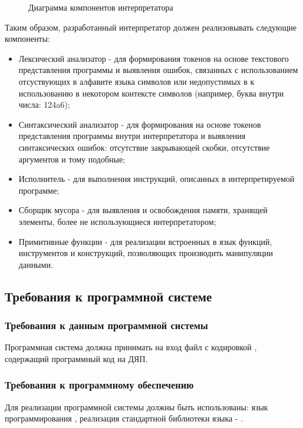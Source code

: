 \begin{figure}[ht]
	\caption{Диаграмма компонентов интерпретатора}
	\label{kompdiagram:image}
\end{figure}

Таким образом, разработанный интерпретатор должен реализовывать следующие компоненты:
\begin{itemize}
	\item Лексический анализатор - для формирования токенов на основе текстового представления программы и выявления ошибок, связанных с использованием отсуствующих в алфавите языка символов или недопустимых в к использованию в некотором контексте символов (например, буква внутри числа: 124a6);
	\item Синтаксический анализатор - для формирования на основе токенов представления программы внутри интерпретатора и выявления синтаксических ошибок: отсутствие закрывающей скобки, отсутствие аргументов и тому подобные;
	\item Исполнитель - для выполнения инструкций, описанных в интерпретируемой программе;
	\item Сборщик мусора - для выявления и освобождения памяти, хранящей элементы, более не использующиеся интерпретатором;
	\item Примитивные функции - для реализации встроенных в язык функций, инструментов и конструкций, позволяющих производить манипуляции данными.
\end{itemize}


\subsection{Требования к программной системе}

\subsubsection{Требования к данным программной системы}
Программная система должна принимать на вход файл с кодировкой , содержащий программный код на ДЯП.

\subsubsection{Требования к программному обеспечению}
Для реализации программной системы должны быть использованы: язык программирования , реализация стандартной библиотеки языка - .

